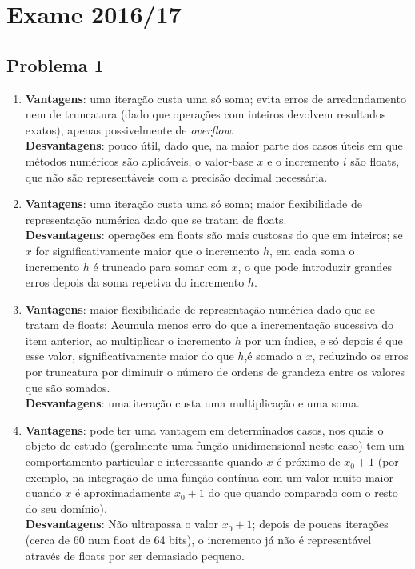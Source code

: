 \setcounter{chapter}{15}
\chapter{Exame 2016/17}
{
\renewcommand{\thesubsection}{\thesection\alph{subsection}}

\section{Problema 1}
\begin{enumerate}
    \item
    \textbf{Vantagens}: uma iteração custa uma só soma; evita erros de arredondamento nem de truncatura (dado que operações com inteiros devolvem resultados exatos), apenas possivelmente de \textit{overflow}.\\
    \textbf{Desvantagens}: pouco útil, dado que, na maior parte dos casos úteis em que métodos numéricos são aplicáveis, o valor-base $x$ e o incremento $i$ são floats, que não são representáveis com a precisão decimal necessária.
    \item 
    \textbf{Vantagens}: uma iteração custa uma só soma; maior flexibilidade de representação numérica dado que se tratam de floats.\\
    \textbf{Desvantagens}: operações em floats são mais custosas do que em inteiros; se $x$ for significativamente maior que o incremento $h$, em cada soma o incremento $h$ é truncado para somar com $x$, o que pode introduzir grandes erros depois da soma repetiva do incremento $h$.
    \item
    \textbf{Vantagens}: maior flexibilidade de representação numérica dado que se tratam de floats; Acumula menos erro do que a incrementação sucessiva do item anterior, ao multiplicar o incremento $h$ por um índice, e só depois é que esse valor, significativamente maior do que $h$,é somado a $x$, reduzindo os erros por truncatura por diminuir o número de ordens de grandeza entre os valores que são somados.\\
    \textbf{Desvantagens}: uma iteração custa uma multiplicação e uma soma.
    \item
    \textbf{Vantagens}: pode ter uma vantagem em determinados casos, nos quais o objeto de estudo (geralmente uma função unidimensional neste caso) tem um comportamento particular e interessante quando $x$ é próximo de $x_0+1$ (por exemplo, na integração de uma função contínua com um valor muito maior quando $x$ é aproximadamente $x_0+1$ do que quando comparado com o resto do seu domínio).\\
    \textbf{Desvantagens}: Não ultrapassa o valor $x_0+1$; depois de poucas iterações (cerca de 60 num float de 64 bits), o incremento já não é representável através de floats por ser demasiado pequeno.
\end{enumerate}

}
